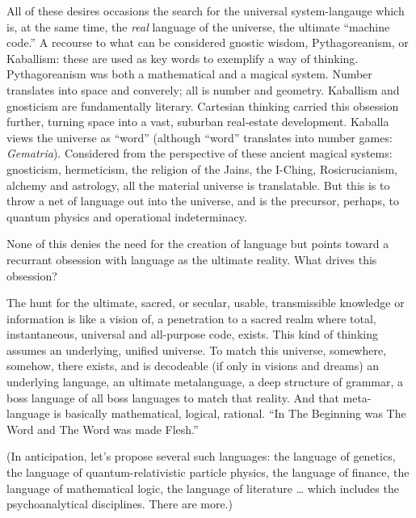 All of these desires occasions the search for the universal system-langauge which is,
at the same time, the \emph{real} language of the universe, the ultimate \enquote{machine code.}
A recourse to what can be considered gnostic wisdom, Pythagoreanism, or Kaballism:
these are used as key words to exemplify a way of thinking. Pythagoreanism was both a
mathematical and a magical system. Number translates into space and converely; all is
number and geometry. Kaballism and gnosticism are fundamentally literary. Cartesian
thinking carried this obsession further, turning space into a vast, suburban real-estate
development. Kaballa views the universe as \enquote{word} (although \enquote{word} translates into
number games: \emph{Gematria}). Considered from the perspective of these ancient magical
systems: gnosticism, hermeticism, the religion of the Jains, the I-Ching, Rosicrucianism,
alchemy and astrology, all the material universe is translatable. But this is to throw a
net of language out into the universe, and is the precursor, perhaps, to quantum physics
and operational indeterminacy.

None of this denies the need for the creation of language but points toward a recurrant obsession with language as the ultimate reality. What drives this obsession?

The hunt for the ultimate, sacred, or secular, usable, transmissible knowledge or information is like a vision of, a penetration to a sacred realm where total, instantaneous,
universal and all-purpose code, exists. This kind of thinking assumes an underlying,
unified universe. To match this universe, somewhere, somehow,
there exists, and is decodeable (if only in visions and dreams)
an underlying language, an ultimate metalanguage, a deep structure of grammar, a
boss language of all boss languages to match that reality. 
And that meta-language is basically mathematical, logical, rational. 
\enquote{In The Beginning was The Word and The Word was made Flesh.}

(In anticipation, let's propose several such languages:
the language of genetics, the language of quantum-relativistic 
particle physics, the language of finance, the language of
mathematical logic, the language of literature \ldots
which includes the psychoanalytical disciplines. There are more.)


